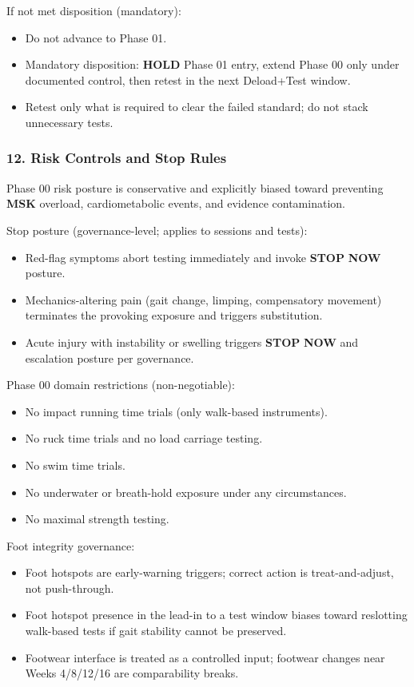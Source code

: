 \documentclass[10pt]{article}
\begin{document}
If not met disposition (mandatory):

\begin{itemize}
\item Do not advance to Phase 01.
\item Mandatory disposition: \textbf{HOLD} Phase 01 entry, extend Phase 00 only under documented control, then retest in the next Deload+Test window.
\item Retest only what is required to clear the failed standard; do not stack unnecessary tests.
\end{itemize}

\subsubsection*{12. Risk Controls and Stop Rules}

Phase 00 risk posture is conservative and explicitly biased toward preventing \textbf{MSK} overload, cardiometabolic events, and evidence contamination.

Stop posture (governance-level; applies to sessions and tests):

\begin{itemize}
\item Red-flag symptoms abort testing immediately and invoke \textbf{STOP} \textbf{NOW} posture.
\item Mechanics-altering pain (gait change, limping, compensatory movement) terminates the provoking exposure and triggers substitution.
\item Acute injury with instability or swelling triggers \textbf{STOP} \textbf{NOW} and escalation posture per governance.
\end{itemize}

Phase 00 domain restrictions (non-negotiable):

\begin{itemize}
\item No impact running time trials (only walk-based instruments).
\item No ruck time trials and no load carriage testing.
\item No swim time trials.
\item No underwater or breath-hold exposure under any circumstances.
\item No maximal strength testing.
\end{itemize}

Foot integrity governance:

\begin{itemize}
\item Foot hotspots are early-warning triggers; correct action is treat-and-adjust, not push-through.
\item Foot hotspot presence in the lead-in to a test window biases toward reslotting walk-based tests if gait stability cannot be preserved.
\item Footwear interface is treated as a controlled input; footwear changes near Weeks 4/8/12/16 are comparability breaks.
\end{itemize}
\end{document}
